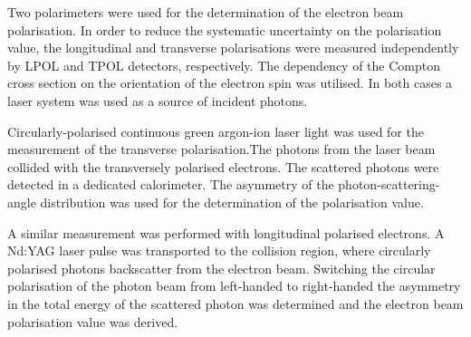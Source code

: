 Two polarimeters were used for the determination of the electron beam polarisation. In order to reduce the systematic uncertainty on the polarisation value, the longitudinal and transverse polarisations were measured independently by LPOL and TPOL detectors, respectively. The dependency of the Compton cross section on the orientation of the electron spin was utilised. In both cases a laser system was used as a source of incident photons.

Circularly-polarised continuous green argon-ion laser light was used for the measurement of the transverse polarisation.The photons from the laser beam collided with the transversely polarised electrons. The scattered photons were detected in a dedicated calorimeter. The asymmetry of the photon-scattering-angle distribution was used for the determination of the polarisation value.

A similar measurement was performed with longitudinal polarised electrons. A Nd:YAG laser pulse was transported to the collision region, where circularly polarised photons backscatter from the electron beam. Switching the circular polarisation of the photon beam from left-handed to right-handed the asymmetry in the total energy of the scattered photon was determined and the electron beam polarisation value was derived.
